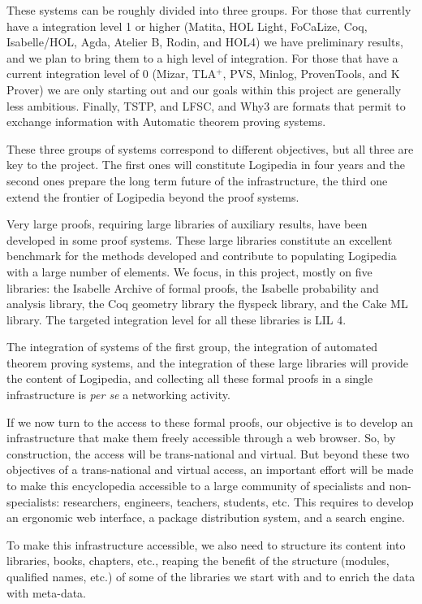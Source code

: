 These systems can be roughly divided into three groups.  For those
that currently have a integration level 1 or higher (Matita, HOL
Light, FoCaLize, Coq, Isabelle/HOL, Agda, Atelier B, Rodin, and HOL4)
we have preliminary results, and we plan to bring them to a high level
of integration.  For those that have a current integration level of 0
(Mizar, TLA$^+$, PVS, Minlog, ProvenTools, and K Prover) we are only
starting out and our goals within this project are generally less
ambitious. Finally, TSTP, and LFSC, and Why3 are formats that permit
to exchange information with Automatic theorem proving systems.

These three groups of systems correspond to different
objectives, but all three are key to the project. The first ones will
constitute Logipedia in four years and the second ones prepare the
long term future of the infrastructure, the third one extend the
frontier of Logipedia beyond the proof systems.

Very large proofs, requiring large libraries of auxiliary results,
have been developed in some proof systems. These large libraries
constitute an excellent benchmark for the methods developed and
contribute to populating Logipedia with a large number of elements.
We focus, in this project, mostly on five libraries: the Isabelle
Archive of formal proofs, the Isabelle probability and analysis
library, the Coq geometry library the flyspeck library, and the Cake
ML library.  The targeted integration level for all these libraries is
LIL 4.

The integration of systems of the first group, the integration of
automated theorem proving systems, and the integration of these large
libraries will provide the content of Logipedia, and collecting all
these formal proofs in a single infrastructure is {\em per se} a
networking activity.

If we now turn to the access to these formal proofs, our objective is
to develop an infrastructure that make them freely accessible through
a web browser. So, by construction, the access will be trans-national
and virtual. But beyond these two objectives of a trans-national and
virtual access, an important effort will be made to make this
encyclopedia accessible to a large community of specialists and
non-specialists: researchers, engineers, teachers, students, etc.
This requires to develop an ergonomic web interface,
a package distribution system, and a search engine.

To make this infrastructure accessible, we also need to structure its
content into libraries, books, chapters, etc., reaping the benefit of
the structure (modules, qualified names, etc.) of some of the
libraries we start with and to enrich the data with meta-data.

